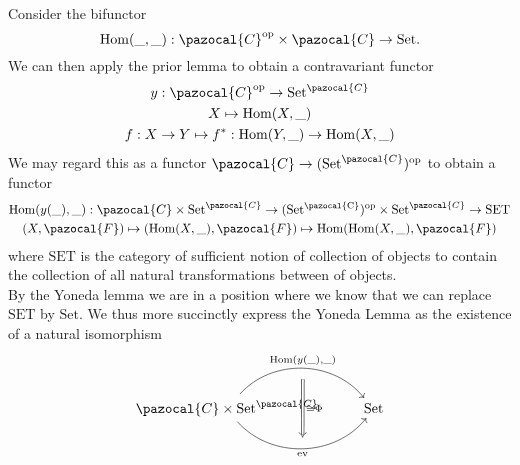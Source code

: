 Consider the bifunctor 
$$
    \Hom(\_,\_) : \pazocal{C}\op \times \pazocal{C} \rightarrow \mathrm{Set}.
$$
We can then apply the prior lemma to obtain a contravariant functor 
\begin{gather*}
    y: \pazocal{C}\op \rightarrow \mathrm{Set}^\pazocal{C}\\
    X\mapsto \Hom(X,\_)\\
    f : X\rightarrow Y \mapsto f^\ast : \Hom(Y,\_) \rightarrow \Hom(X,\_)
\end{gather*}
We may regard this as a  functor $\pazocal{C} \rightarrow (\mathrm{Set}^\pazocal{C})\op$ to obtain a functor 
\begin{gather}
    \Hom(y(\_),\_) : \pazocal{C}\times \mathrm{Set}^\pazocal{C}\rightarrow (\mathrm{Set^\pazocal{C}})\op\times \mathrm{Set}^\pazocal{C}\rightarrow \mathrm{SET}\\
    (X,\pazocal{F})\mapsto (\Hom(X,\_),\pazocal{F}) \mapsto \Hom(\Hom(X,\_),\pazocal{F})
\end{gather}
where $\mathrm{SET}$ is the category of sufficient notion of collection of objects to contain the collection of all natural transformations between of objects.\\
By the Yoneda lemma we are in a position where we know that we can replace $\mathrm{SET}$ by $\mathrm{Set}$. We thus more succinctly express the Yoneda Lemma as the existence of a natural isomorphism 
$$
    \begin{tikzcd}
        \pazocal{C}\times \mathrm{Set}^\pazocal{C} \arrow[r,bend left=50,"\Hom(y(\_){,}\_)"{name=1, above}]\arrow[r,bend right=50,"\ev"{name=2,below}] & \mathrm{Set} \arrow[Rightarrow, from=1,to=2,shorten <= 8, shorten >= 8, "\cong\Phi"]
    \end{tikzcd}
$$ 


